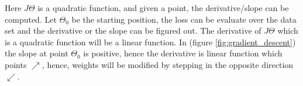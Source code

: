 Here $J{\Theta}$ is a  quadratic function, and given a point, the derivative/slope can be computed. Let $\Theta_0$ be the starting position, the loss can be evaluate over the data set and the derivative or the slope can be figured out. The derivative of $J{\Theta}$ which is a quadratic function will be a linear function. In (figure \ref{fig:gradient_descent}) the slope at point $\Theta_0$ is positive, hence the derivative is linear function which points $\nearrow$, hence, weights will be modified by stepping in the opposite direction $\swarrow$.



